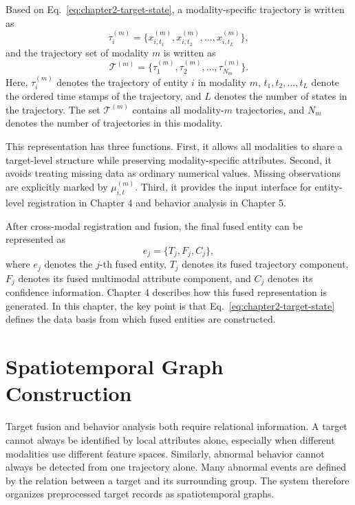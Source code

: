 Based on Eq.~\eqref{eq:chapter2-target-state}, a modality-specific trajectory is written as
\begin{equation}
  \tau_i^{(m)}
  =
  \{x_{i,t_1}^{(m)},x_{i,t_2}^{(m)},\ldots,x_{i,t_L}^{(m)}\},
\end{equation}
and the trajectory set of modality \(m\) is written as
\begin{equation}
  \mathcal{T}^{(m)}
  =
  \{\tau_1^{(m)},\tau_2^{(m)},\ldots,\tau_{N_m}^{(m)}\}.
\end{equation}
Here, \(\tau_i^{(m)}\) denotes the trajectory of entity \(i\) in modality \(m\), \(t_1,t_2,\ldots,t_L\) denote the ordered time stamps of the trajectory, and \(L\) denotes the number of states in the trajectory. The set \(\mathcal{T}^{(m)}\) contains all modality-\(m\) trajectories, and \(N_m\) denotes the number of trajectories in this modality.

This representation has three functions. First, it allows all modalities to share a target-level structure while preserving modality-specific attributes. Second, it avoids treating missing data as ordinary numerical values. Missing observations are explicitly marked by \(\mu_{i,t}^{(m)}\). Third, it provides the input interface for entity-level registration in Chapter 4 and behavior analysis in Chapter 5.

After cross-modal registration and fusion, the final fused entity can be represented as
\begin{equation}
  e_j = \{T_j,F_j,C_j\},
\end{equation}
where \(e_j\) denotes the \(j\)-th fused entity, \(T_j\) denotes its fused trajectory component, \(F_j\) denotes its fused multimodal attribute component, and \(C_j\) denotes its confidence information. Chapter 4 describes how this fused representation is generated. In this chapter, the key point is that Eq.~\eqref{eq:chapter2-target-state} defines the data basis from which fused entities are constructed.

\section{Spatiotemporal Graph Construction}
Target fusion and behavior analysis both require relational information. A target cannot always be identified by local attributes alone, especially when different modalities use different feature spaces. Similarly, abnormal behavior cannot always be detected from one trajectory alone. Many abnormal events are defined by the relation between a target and its surrounding group. The system therefore organizes preprocessed target records as spatiotemporal graphs.

